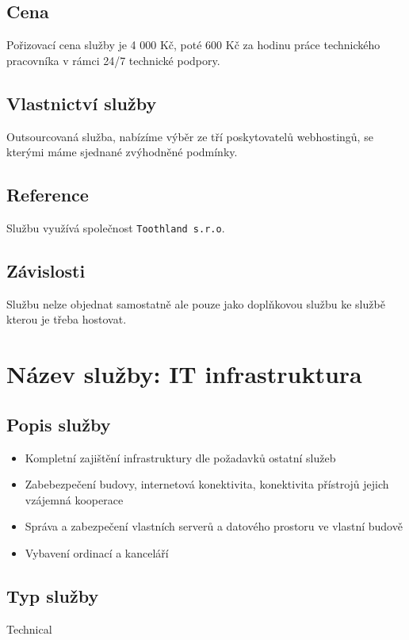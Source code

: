 \documentclass[12pt, a4paper, titlepage]{article}
\begin{document}
	\subsection*{Cena}
	Pořizovací cena služby je 4 000 Kč, poté 600 Kč za hodinu práce technického pracovníka v rámci 24/7 technické podpory.

	\subsection*{Vlastnictví služby}
	Outsourcovaná služba, nabízíme výběr ze tří poskytovatelů webhostingů, se kterými máme sjednané zvýhodněné podmínky.

	\subsection*{Reference}
	Službu využívá společnost \texttt{Toothland s.r.o}.

	\newpage

	\noindent\makebox[\linewidth]{\rule{16cm}{0.4pt}}

	\subsection*{Závislosti}
	Službu nelze objednat samostatně ale pouze jako doplňkovou službu ke službě kterou je třeba hostovat.

	

	\section*{Název služby: IT infrastruktura}

	\subsection*{Popis služby}
	\begin{itemize}
		\item Kompletní zajištění infrastruktury dle požadavků ostatní služeb
		\item Zabebezpečení budovy, internetová konektivita, konektivita přístrojů jejich vzájemná kooperace
		\item Správa a zabezpečení vlastních serverů a datového prostoru ve vlastní budově
		\item Vybavení ordinací a kanceláří
	\end{itemize}

	\subsection*{Typ služby}
	Technical
\end{document}
